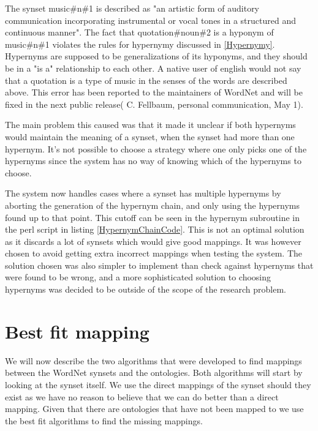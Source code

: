 The synset music\#n\#1 is described as "an artistic form of auditory communication incorporating instrumental or vocal tones in a structured and continuous manner".
The fact that quotation\#noun\#2 is a hyponym of music\#n\#1 violates the rules for hypernymy discussed in \ref{Hypernymy}.
Hypernyms are supposed to be generalizations of its hyponyms,
and they should be in a "is a" relationship to each other.
A native user of english would not say that a quotation is a type of music in the senses of the words are described above.
This error has been reported to the maintainers of WordNet and will be fixed in the next public release( C. Fellbaum, personal communication, May 1).

The main problem this caused was that it made it unclear if both hypernyms would maintain the meaning of a synset,
when the synset had more than one hypernym.
It's not possible to choose a strategy where one only picks one of the hypernyms since the system has no way of
knowing which of the hypernyms to choose.

The system now handles cases where a synset has multiple hypernyms by aborting the generation of the hypernym chain,
and only using the hypernyms found up to that point.
This cutoff can be seen in the hypernym subroutine in the perl script in listing \ref{HypernymChainCode}.
This is not an optimal solution as it discards a lot of synsets which would give good mappings.
It was however chosen to avoid getting extra incorrect mappings when testing the system.
The solution chosen was also simpler to implement than check against hypernyms that were found to be wrong,
and a more sophisticated solution to choosing hypernyms was decided to be outside of the scope of the research problem.

\section{Best fit mapping}
\label{BestFitMapping}
We will now describe the two algorithms that were developed to find mappings between the WordNet synsets and the ontologies.
Both algorithms will start by looking at the synset itself.
We use the direct mappings of the synset should they exist as we have no reason to believe that we can do better than a
direct mapping.
Given that there are ontologies that have not been mapped to we use the best fit algorithms to find the missing mappings.

